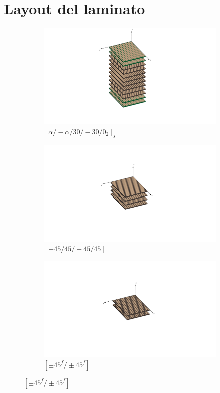 \documentclass[a4paper,num-refs]{oup-contemporary}
\begin{document}
\section{Layout del laminato}

\begin{figure}[bt!]
	\centering
	\begin{subfigure}[t]{0.24\textwidth}
		\centering
		
		\includegraphics[width=\textwidth]{struct1.pdf}
		\caption{$[\alpha /-\alpha / 30 /-30 / 0_{2}]_{\mathrm{s}}$ }
		
	\end{subfigure}
	\hfill
	\begin{subfigure}[t]{0.24\textwidth}
		\centering
		\includegraphics[width=\textwidth]{struct2.pdf}
		\caption{$[-45 / 45 /-45 / 45]$}
		
	\end{subfigure}
	\hfill
	\begin{subfigure}[t]{0.24\textwidth}
		\centering
		\includegraphics[width=\textwidth]{struct3.pdf}
		\caption{$[\pm 45^{f} / \pm 45^{f}]$}
		

\end{subfigure}
\end{figure}
\end{document}
